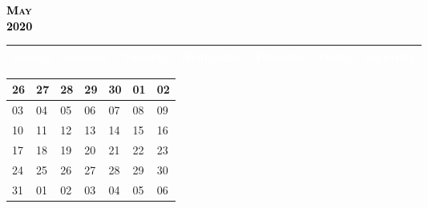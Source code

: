 \documentclass{article}
\newcommand{\daysize}{2.5cm}		%
\newcommand{\dw}{3.5cm}					%
\newcommand{\mkday}[1]{
  #1
  \vspace{\daysize}
}
\begin{document}
		\begin{center}
			\textsc{\LARGE \textbf{\textcolor{black}{
			May
			}}}\\ %
			\textsc{\large \textbf{\textcolor{black}{
			2020
			}}} %
		\end{center}

		\begin{center}
		\begin{tabular}{| p{\dw} | p{\dw} | p{\dw} | p{\dw} | p{\dw} | p{\dw} | p{\dw} |}
			\hline
			\cellcolor{bannercolor} \textcolor{white}{Sunday} &
			\cellcolor{bannercolor} \textcolor{white}{Monday} &
			\cellcolor{bannercolor} \textcolor{white}{Tuesday} &
			\cellcolor{bannercolor} \textcolor{white}{Wednesday} &
			\cellcolor{bannercolor} \textcolor{white}{Thursday} &
			\cellcolor{bannercolor} \textcolor{white}{Friday} &
			\cellcolor{bannercolor} \textcolor{white}{Saturday} \\
			\hline
		\end{tabular}

		\vspace{0.1cm}

		\begin{tabular}{| p{\dw} | p{\dw} | p{\dw} | p{\dw} | p{\dw} | p{\dw} | p{\dw} |}
\hline 
\cellcolor{weekendcolor}\mkday{
    26
} & 
\mkday{
    27
} &
\mkday{
    28
} &
\mkday{
    29
} &
\mkday{
    30
} &
\mkday{
    01
} &
\cellcolor{weekendcolor}\mkday{
    02
} 
\\
\hline 
\cellcolor{weekendcolor}\mkday{
    03
} & 
\mkday{
    04
} &
\mkday{
    05
} &
\mkday{
    06
} &
\mkday{
    07
} &
\mkday{
    08
} &
\cellcolor{weekendcolor}\mkday{
    09
} 
\\
\hline 
\cellcolor{weekendcolor}\mkday{
    10
} & 
\mkday{
    11
} &
\mkday{
    12
} &
\mkday{
    13
} &
\mkday{
    14
} &
\mkday{
    15
} &
\cellcolor{weekendcolor}\mkday{
    16
} 
\\
\hline 
\cellcolor{weekendcolor}\mkday{
    17
} & 
\mkday{
    18
} &
\mkday{
    19
} &
\mkday{
    20
} &
\mkday{
    21
} &
\mkday{
    22
} &
\cellcolor{weekendcolor}\mkday{
    23
} 
\\
\hline 
\cellcolor{weekendcolor}\mkday{
    24
} & 
\mkday{
    25
} &
\mkday{
    26
} &
\mkday{
    27
} &
\mkday{
    28
} &
\mkday{
    29
} &
\cellcolor{weekendcolor}\mkday{
    30
} 
\\
\hline 
\cellcolor{weekendcolor}\mkday{
    31
} & 
\mkday{
    01
} &
\mkday{
    02
} &
\mkday{
    03
} &
\mkday{
    04
} &
\mkday{
    05
} &
\cellcolor{weekendcolor}\mkday{
    06
} 
\\
		\end{tabular}

		\end{center}
\end{document}
